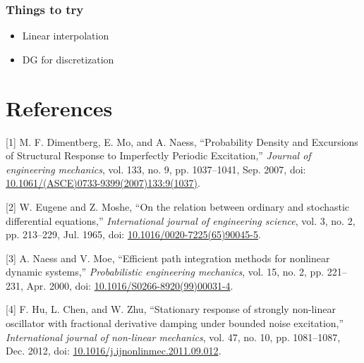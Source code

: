 \documentclass[11pt]{article}
\begin{document}
\subsubsection{Things to try}
\label{sec:org670a140}
\begin{itemize}
\item Linear interpolation
\item DG for discretization
\end{itemize}
\section{References}
\label{sec:orge162bb6}
\hypertarget{citeproc_bib_item_1}{[1] M. F. Dimentberg, E. Mo, and A. Naess, “Probability Density and Excursions of Structural Response to Imperfectly Periodic Excitation,” \textit{Journal of engineering mechanics}, vol. 133, no. 9, pp. 1037–1041, Sep. 2007, doi: \href{https://doi.org/10.1061/(ASCE)0733-9399(2007)133:9(1037)}{10.1061/(ASCE)0733-9399(2007)133:9(1037)}.}

\hypertarget{citeproc_bib_item_2}{[2] W. Eugene and Z. Moshe, “On the relation between ordinary and stochastic differential equations,” \textit{International journal of engineering science}, vol. 3, no. 2, pp. 213–229, Jul. 1965, doi: \href{https://doi.org/10.1016/0020-7225(65)90045-5}{10.1016/0020-7225(65)90045-5}.}

\hypertarget{citeproc_bib_item_3}{[3] A. Naess and V. Moe, “Efficient path integration methods for nonlinear dynamic systems,” \textit{Probabilistic engineering mechanics}, vol. 15, no. 2, pp. 221–231, Apr. 2000, doi: \href{https://doi.org/10.1016/S0266-8920(99)00031-4}{10.1016/S0266-8920(99)00031-4}.}

\hypertarget{citeproc_bib_item_4}{[4] F. Hu, L. Chen, and W. Zhu, “Stationary response of strongly non-linear oscillator with fractional derivative damping under bounded noise excitation,” \textit{International journal of non-linear mechanics}, vol. 47, no. 10, pp. 1081–1087, Dec. 2012, doi: \href{https://doi.org/10.1016/j.ijnonlinmec.2011.09.012}{10.1016/j.ijnonlinmec.2011.09.012}.}\bigskip
\end{document}
